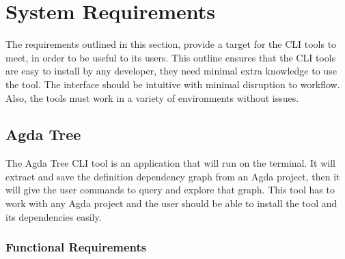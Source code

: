 
\chapter{System Requirements} \label{ch:system requirements}

 The requirements outlined in this
section, provide a target for the CLI tools to meet, in order to be useful to
its users. This outline ensures that the CLI tools are easy to install by any
developer, they need minimal extra knowledge to use the tool. The interface
should be intuitive with minimal disruption to workflow. Also, the tools must
work in a variety of environments without issues.

\section{Agda Tree}

The Agda Tree CLI tool is an application that will run on the terminal. It will
extract and save the definition dependency graph from an Agda project, then it
will give the user commands to query and explore that graph. This tool has to
work with any Agda project and the user should be able to install the tool and
its dependencies easily.

\subsection{Functional Requirements}

